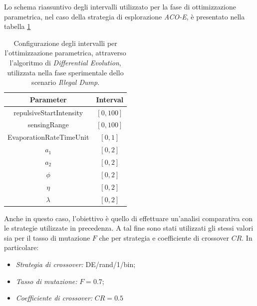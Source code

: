 Lo schema riassuntivo degli intervalli utilizzato per la fase di ottimizzazione parametrica, nel caso della strategia di esplorazione \textit{ACO-E}, è presentato nella tabella \ref{tabella_intervalli_dump_ACO}

\begin{table}[H]
    \centering
    \captionsetup{justification=centering, margin=2cm, font=footnotesize}
    \begin{tabular}{|c|c|}
    \hline
    \textbf{Parameter}              & \textbf{Interval}         \\ \hline
    repulsiveStartIntensity         & $[0,100]$                 \\ \hline
    sensingRange                    & $[0,100]$                 \\ \hline
    EvaporationRateTimeUnit         & $[0,1]$                   \\ \hline
    $a_{1}$                         & $[0,2]$                   \\ \hline
    $a_{2}$                         & $[0,2]$                   \\ \hline
    $\phi$                          & $[0,2]$                   \\ \hline
    $\eta$                          & $[0,2]$                   \\ \hline
    $\lambda$                       & $[0,2]$                   \\ \hline
    \end{tabular}%
    
    \caption{Configurazione degli intervalli per l'ottimizzazione parametrica, attraverso l'algoritmo di \textit{Differential Evolution}, utilizzata nella fase sperimentale dello scenario \textit{Illegal Dump}.}
    \label{tabella_intervalli_dump_ACO}
\end{table}

Anche in questo caso, l'obiettivo è quello di effettuare un'analisi comparativa con le strategie utilizzate in precedenza.
A tal fine sono stati utilizzati gli stessi valori sia per il tasso di mutazione $F$ che per strategia e coefficiente di crossover $CR$.
In particolare:
\begin{itemize}
    \item \textit{Strategia di crossover:} DE/rand/1/bin;
    \item \textit{Tasso di mutazione:} $F=0.7$;
    \item \textit{Coefficiente di crossover:} $CR=0.5$
\end{itemize}

